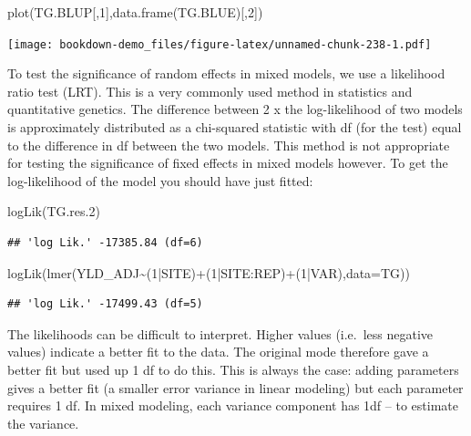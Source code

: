 \documentclass[
]{book}
\newenvironment{Shaded}{\begin{snugshade}}{\end{snugshade}}
\newcommand{\AttributeTok}[1]{\textcolor[rgb]{0.77,0.63,0.00}{#1}}
\newcommand{\DecValTok}[1]{\textcolor[rgb]{0.00,0.00,0.81}{#1}}
\newcommand{\FloatTok}[1]{\textcolor[rgb]{0.00,0.00,0.81}{#1}}
\newcommand{\FunctionTok}[1]{\textcolor[rgb]{0.00,0.00,0.00}{#1}}
\newcommand{\NormalTok}[1]{#1}
\newcommand{\SpecialCharTok}[1]{\textcolor[rgb]{0.00,0.00,0.00}{#1}}
\begin{document}
\begin{Shaded}
\begin{Highlighting}[]
\FunctionTok{plot}\NormalTok{(TG.BLUP[,}\DecValTok{1}\NormalTok{],}\FunctionTok{data.frame}\NormalTok{(TG.BLUE)[,}\DecValTok{2}\NormalTok{])}
\end{Highlighting}
\end{Shaded}

\texttt{[image: bookdown-demo\_files/figure-latex/unnamed-chunk-238-1.pdf]}

To test the significance of random effects in mixed models, we use a likelihood ratio test (LRT). This is a very commonly used method in statistics and quantitative genetics. The difference between 2 x the log-likelihood of two models is approximately distributed as a chi-squared statistic with df (for the test) equal to the difference in df between the two models. This method is not appropriate for testing the significance of fixed effects in mixed models however. To get the log-likelihood of the model you should have just fitted:

\begin{Shaded}
\begin{Highlighting}[]
\FunctionTok{logLik}\NormalTok{(TG.res}\FloatTok{.2}\NormalTok{)}
\end{Highlighting}
\end{Shaded}

\begin{verbatim}
## 'log Lik.' -17385.84 (df=6)
\end{verbatim}

\begin{Shaded}
\begin{Highlighting}[]
\FunctionTok{logLik}\NormalTok{(}\FunctionTok{lmer}\NormalTok{(YLD\_ADJ}\SpecialCharTok{\textasciitilde{}}\NormalTok{(}\DecValTok{1}\SpecialCharTok{|}\NormalTok{SITE)}\SpecialCharTok{+}\NormalTok{(}\DecValTok{1}\SpecialCharTok{|}\NormalTok{SITE}\SpecialCharTok{:}\NormalTok{REP)}\SpecialCharTok{+}\NormalTok{(}\DecValTok{1}\SpecialCharTok{|}\NormalTok{VAR),}\AttributeTok{data=}\NormalTok{TG))}
\end{Highlighting}
\end{Shaded}

\begin{verbatim}
## 'log Lik.' -17499.43 (df=5)
\end{verbatim}

The likelihoods can be difficult to interpret. Higher values (i.e.~less negative values) indicate a better fit to the data. The original mode therefore gave a better fit but used up 1 df to do this. This is always the case: adding parameters gives a better fit (a smaller error variance in linear modeling) but each parameter requires 1 df. In mixed modeling, each variance component has 1df -- to estimate the variance.
\end{document}
